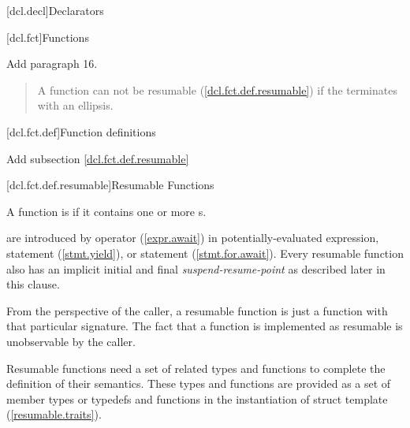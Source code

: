 
[dcl.decl]{Declarators}

\setcounter{section}{3}
\setcounter{subsection}{4}
[dcl.fct]{Functions}%

Add paragraph 16.

\begin{quote}
\setcounter{Paras}{15}
\pnum
A function can not be resumable (\ref{dcl.fct.def.resumable}) if the  terminates with an ellipsis.
\end{quote}

\setcounter{section}{3}
[dcl.fct.def]{Function definitions}

Add subsection \ref{dcl.fct.def.resumable}

\setcounter{subsection}{3}
[dcl.fct.def.resumable]{Resumable Functions}


\pnum
A function is  if it contains
one or more s. 

\pnum
{} are introduced by  operator (\ref{expr.await}) in potentially-evaluated expression,
 statement (\ref{stmt.yield}), 
or  statement (\ref{stmt.for.await}). Every resumable function
also has an implicit initial and final \textit{suspend-resume-point} as described later in this clause. 

\pnum
\enternote
From the perspective of the caller, a resumable function is just a function with that particular signature. The fact that a function is implemented as resumable is unobservable by the caller. 
\exitnote

\pnum
Resumable functions need a set of related types and functions
to complete the definition of their semantics.
These types and functions are provided as a set of member types or typedefs
and functions in the instantiation of struct template
 (\ref{resumable.traits}). 

